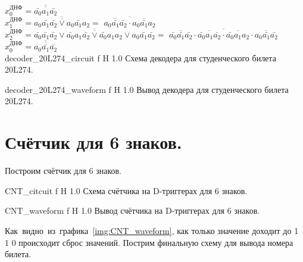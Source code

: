 \documentclass{bmstu}
\begin{document}
	$x_0^{\text{ДНФ}} = \overline{\overline{\bar{a_0} a_1 \bar{a_2}}}$ \\
	$x_1^{\text{ДНФ}} = \overline{\overline{a_0 \bar{a_1} \bar{a_2} \vee a_0 \bar{a_1} a_2}} =$ $\overline{\overline{a_0 \bar{a_1} \bar{a_2}} \cdot \overline{a_0 \bar{a_1} a_2}}$ \\
	$x_2^{\text{ДНФ}} = \overline{\overline{\bar{a_0} \bar{a_1} \bar{a_2} \vee \bar{a_0} a_1 \bar{a_2} \vee \bar{a_0} a_1 a_2 \vee a_0 \bar{a_1} \bar{a_2}}} =$
	$\overline{\overline{\bar{a_0} \bar{a_1} \bar{a_2}} \cdot \overline{\bar{a_0} a_1 \bar{a_2}} \cdot \overline{\bar{a_0} a_1 a_2} \cdot \overline{a_0 \bar{a_1} \bar{a_2}}}$ \\
	$x_0^{\text{ДНФ}} = \overline{\overline{a_0 \bar{a_1} \bar{a_2}}}$ \\

	{decoder_20L274_circuit}
	{f} %
	{H} %
	{1.0\textwidth} %
	{Схема декодера для студенческого билета 20L274.} %

	{decoder_20L274_waveform}
	{f} %
	{H} %
	{1.0\textwidth} %
	{Вывод декодера для студенческого билета 20L274.} %
	
	\section{Счётчик для 6 знаков.}
	\begin{flushleft}
		Построим счётчик для 6 знаков.
	\end{flushleft}

	{CNT_citcuit}
	{f} %
	{H} %
	{1.0\textwidth} %
	{Схема счётчика на D-триггерах для 6 знаков.} %

	{CNT_waveform}
	{f} %
	{H} %
	{1.0\textwidth} %
	{Вывод счётчика на D-триггерах для 6 знаков.} %
	
	\begin{flushleft}
		Как~видно~из~графика~\ref{img:CNT_waveform}, как только значение доходит
		до 1 1 0 происходит сброс значений. Пострим финальную схему для вывода
		номера билета.
	\end{flushleft}
\end{document}
